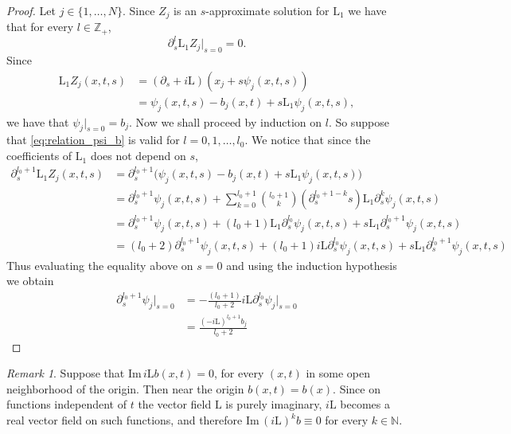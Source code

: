 \documentclass[11pt]{amsart}
\DeclareMathOperator{\ourL}{L}
\renewcommand{\Im}{\mathrm{Im}\,}
\theoremstyle{definition}
\theoremstyle{remark}
\newtheorem{rmk}[defn]{Remark}
\theoremstyle{plain}
\begin{document}
\begin{proof}
%
Let $j \in \{1, \dots, N\}$. Since $Z_j$ is an $s$-approximate solution for $\mathrm{L}_1$ we have that for every $l \in \mathbb{Z}_+$,
%
\begin{equation*}
	\partial_s^l \mathrm{L}_1 Z_j|_{s=0} = 0.
\end{equation*}
%
Since 
%
\begin{align*}
	\mathrm{L}_1 Z_j(x,t,s) & = (\partial_s +i\mathrm{L})(x_j + s\psi_j(x,t,s))
		\\
 	& = \psi_j(x,t,s) - b_j(x,t) + s\mathrm{L}_1\psi_j(x,t,s),
\end{align*}
 we have that $\psi_j|_{s = 0} = b_j$. Now we shall proceed by induction on $l$. So suppose that \eqref{eq:relation_psi_b} is valid for $l = 0, 1, \dots, l_0$. We notice that since the coefficients of $\mathrm{L}_1$ does not depend on $s$,
 \begin{align*}
 	\partial_s^{l_0+1} \mathrm{L}_1 Z_j(x,t,s) & = \partial_s^{l_0+1} \big(\psi_j(x,t,s) - b_j(x,t) + s\mathrm{L}_1\psi_j(x,t,s)\big) \\
 	& = \partial_s^{l_0+1} \psi_j(x,t,s) + \sum_{k = 0}^{l_0 + 1} \binom{l_0 + 1}{k} (\partial_s^{l_0 +1 - k} s) \mathrm{L}_1 \partial_s^k \psi_j(x,t,s) \\
 	& =  \partial_s^{l_0+1} \psi_j(x,t,s) + (l_0 + 1)\mathrm{L}_1 \partial_s^{l_0} \psi_j(x,t,s) + s \mathrm{L}_1 \partial_s^{l_0 +1} \psi_j(x,t,s) \\
 	& = (l_0 + 2)\partial_s^{l_0+1} \psi_j(x,t,s) + (l_0 + 1)i\mathrm{L} \partial_s^{l_0} \psi_j(x,t,s) + s \mathrm{L}_1 \partial_s^{l_0 +1} \psi_j(x,t,s)
 \end{align*}
%
Thus evaluating the equality above on $s = 0$ and using the induction hypothesis we obtain
%
 \begin{align*}
 	\partial_s^{l_0+1} \psi_j|_{s = 0} & = -\frac{(l_0 + 1)}{l_0 + 2}i\mathrm{L} \partial_s^{l_0} \psi_j|_{s = 0} \\
 	& =  \frac{(-i\mathrm{L})^{l_0+1} b_j}{l_0+2}
 \end{align*}
\end{proof}
%
\begin{rmk}
	Suppose that $\Im i\mathrm{L}b(x,t) = 0$, for every $(x,t)$ in some open neighborhood of the origin. Then near the origin $b(x,t) = b(x)$. Since on functions independent of $t$ the vector field $\mathrm{L}$ is purely imaginary,  $i \mathrm{L}$ becomes a real vector field on such functions, and therefore $\Im (i\mathrm{L})^k b \equiv 0$ for every $k \in \mathbb{N}$.
\end{rmk} 
\end{document}
